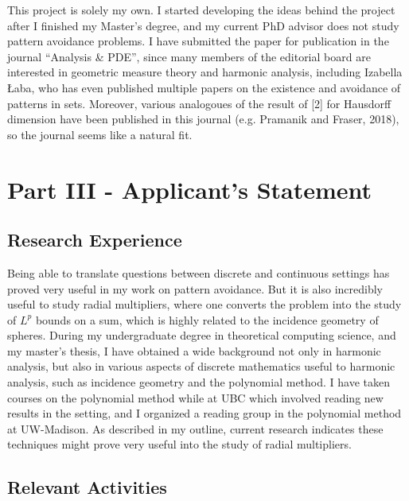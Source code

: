 \documentclass[12pt]{article}
\theoremstyle{plain}
\theoremstyle{remark}
\theoremstyle{definition}
\begin{document}
This project is solely my own. I started developing the ideas behind the project after I finished my Master's degree, and my current PhD advisor does not study pattern avoidance problems. I have submitted the paper for publication in the journal ``Analysis \& PDE'', since many members of the editorial board are interested in geometric measure theory and harmonic analysis, including Izabella Łaba, who has even published multiple papers on the existence and avoidance of patterns in sets. Moreover, various analogoues of the result of [2] for Hausdorff dimension have been published in this journal (e.g. Pramanik and Fraser, 2018), so the journal seems like a natural fit.

\section*{Part III - Applicant's Statement}

\subsection*{Research Experience}

Being able to translate questions between discrete and continuous settings has proved very useful in my work on pattern avoidance. But it is also incredibly useful to study radial multipliers, where one converts the problem into the study of $L^p$ bounds on a sum, which is highly related to the incidence geometry of spheres. During my undergraduate degree in theoretical computing science, and my master's thesis, I have obtained a wide background not only in harmonic analysis, but also in various aspects of discrete mathematics useful to harmonic analysis, such as incidence geometry and the polynomial method. I have taken courses on the polynomial method while at UBC which involved reading new results in the setting, and I organized a reading group in the polynomial method at UW-Madison. As described in my outline, current research indicates these techniques might prove very useful into the study of radial multipliers. 

\subsection*{Relevant Activities}
\end{document}
